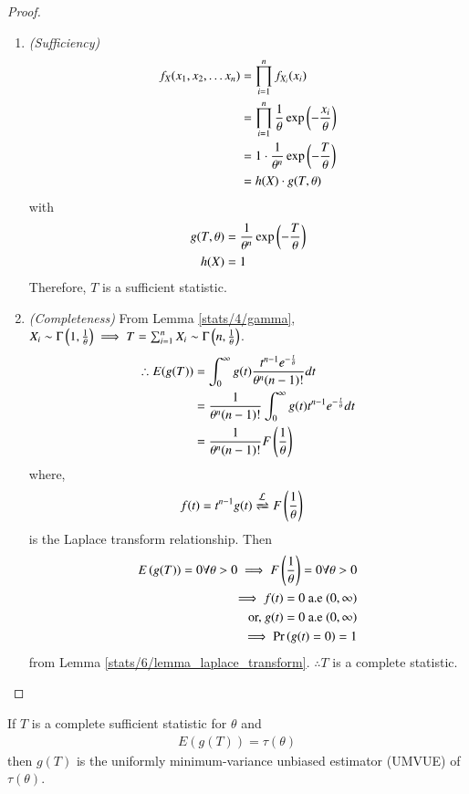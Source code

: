 \begin{proof}
\begin{enumerate}
\item \textit{(Sufficiency)}
\begin{align}
f_{X}(x_1, x_2, \ldots x_n) &= \prod_{i=1}^{n}f_{X_i}(x_i)\\
&= \prod_{i=1}^{n} \dfrac{1}{\theta} \exp\left(-\dfrac{x_i}{\theta}\right) \\
&= 1 \cdot \dfrac{1}{\theta^n} \exp\left(-\dfrac{T}{\theta}\right)\\
&= h(X) \cdot g(T, \theta) 
\end{align}
with 
\begin{align}
g(T, \theta) &= \dfrac{1}{\theta^n} \exp\left(-\dfrac{T}{\theta}\right)\\
h(X) &= 1
\end{align}
Therefore, $T$ is a sufficient statistic.
\item \textit{(Completeness)}
From Lemma     \ref{stats/4/gamma}, $X_i \sim \Gamma \left(1, \frac{1}{\theta}\right) \implies  T = \sum_{i=1}^n X_i \sim \Gamma \left(n, \frac{1}{\theta}\right)$. 
\begin{align}
\therefore E(g(T)) &= 
\int_0 ^{\infty} g(t) \dfrac{t^{n-1} e^{-\frac{t}{\theta}}}{\theta^n(n-1)!} dt\\ 
&= \frac{1}{\theta^n (n-1)!} \int_0 ^{\infty} g(t) t^{n-1} e^{-\frac{t}{\theta}} dt\\ 
&= \frac{1}{\theta^n (n-1)!} F \left(\frac{1}{\theta}\right)
\end{align}
where, 
\begin{align}
f(t) &= t^{n-1}g(t) \xrightleftharpoons[]{\mathcal{L}} F \brak{\frac{1}{\theta}}
\end{align}
is the Laplace transform relationship.
Then
\begin{align}
E\left(g(T)\right)=0 \forall \theta > 0 \implies F \left(\frac{1}{\theta}\right) = 0 \forall  \theta > 0
\label{stats/6/eqn}
\\ \implies 
f(t)=0 \text{ a.e } (0, \infty)\\
\text{or, }g(t)=0 \text{ a.e }(0, \infty)\\
\implies \Pr\left(g(t)=0\right) = 1
\end{align}
from Lemma     \ref{stats/6/lemma_laplace_transform}.  
$\therefore T$ is a complete statistic.
\end{enumerate}
\end{proof}
\begin{theorem}
If $T$ is a complete sufficient statistic for $\theta$ and 
\begin{align}
\label{eqn 2.0.1}
E(g(T)) = \tau(\theta)
\end{align}
then $g(T)$ is the uniformly minimum-variance unbiased estimator (UMVUE) of $\tau(\theta)$.
\end{theorem}
